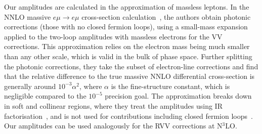 \documentclass[main.tex]{subfiles}
\begin{document}
Our amplitudes are calculated in the approximation of massless leptons.
In the NNLO massive $e\mu \to e\mu$ cross-section calculation~\cite{Broggio:2022htr}, the authors obtain photonic corrections (those with no closed fermion loops), using a small-mass expansion~\cite{Penin:2005eh,Becher:2007cu,Engel:2018fsb} applied to the two-loop amplitudes with massless electrons for the \ac{VV} corrections.
This approximation relies on the electron mass being much smaller than any other scale, which is valid in the bulk of phase space.
Further splitting the photonic corrections, they take the subset of electron-line corrections and find that the relative difference to the true massive NNLO differential cross-section is generally around $10^{-3}\alpha^2$, where $\alpha$ is the fine-structure constant, which is negligible compared to the $10^{-5}$ precision goal.
The approximation breaks down in soft and collinear regions, where they treat the amplitudes using IR factorisation~\cite{Banerjee:2021mty,Engel:2021ccn,Engel:2023ifn}, and is not used for contributions including closed fermion loops~\cite{Engel:2018fsb,Engel:2019nfw}.
Our amplitudes can be used analogously for the \ac{RVV} corrections at N$^3$LO.
\end{document}
